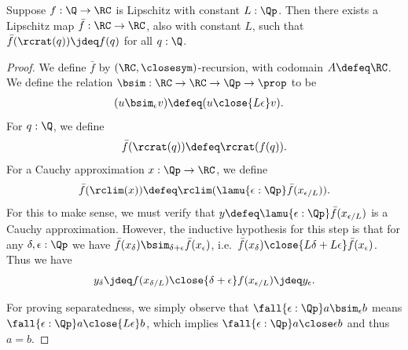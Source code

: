 %
\begin{lem}\label{RC-extend-Q-Lipschitz}
  Suppose $f : \Q \to \RC$ is Lipschitz with constant $L : \Qp$.
  Then there exists a Lipschitz map $\bar{f} : \RC \to \RC$, also with constant $L$, such that $\bar{f}(\rcrat(q)) \jdeq f(q)$ for all $q:\Q$.
\end{lem}

\begin{proof}
  We define $\bar{f}$ by $(\RC,\closesym)$-recursion, with codomain $A\defeq \RC$.
  We define the relation $\mathord{\bsim}: \RC \to \RC \to \Qp \to \prop$ to be
  \begin{align*}
    (u \bsim_\epsilon v) &\defeq (u \close{L\epsilon} v).
  \end{align*}
  For $q : \Q$, we define
  \begin{equation*}
    \bar{f}(\rcrat(q)) \defeq \rcrat(f(q)).
  \end{equation*}
  For a Cauchy approximation $x : \Qp \to \RC$, we define
  \begin{equation*}
    \bar{f}(\rclim(x)) \defeq \rclim(\lamu{\epsilon : \Qp} \bar{f}(x_{\epsilon/L})).
  \end{equation*}
  For this to make sense, we must verify that $y \defeq \lamu{\epsilon : \Qp} \bar{f}(x_{\epsilon/L})$ is a Cauchy approximation.
  However, the inductive hypothesis for this step is that for any $\delta,\epsilon:\Qp$ we have $\bar{f}(x_\delta) \bsim_{\delta+\epsilon} \bar{f}(x_\epsilon)$, i.e.\ $\bar{f}(x_\delta) \close{L\delta+L\epsilon} \bar{f}(x_\epsilon)$.
  Thus we have
  \[y_\delta \jdeq f(x_{\delta/L}) \close{\delta + \epsilon} f(x_{\epsilon/L})   \jdeq y_\epsilon. \]

  For proving separatedness, we simply observe that $\fall{\epsilon:\Qp} a\bsim_\epsilon b$ means $\fall{\epsilon:\Qp} a\close{L\epsilon} b$, which implies $\fall{\epsilon:\Qp}a\close\epsilon b$ and thus $a=b$.


\end{proof}
